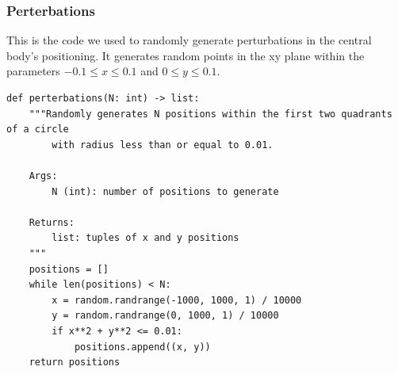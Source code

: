 \documentclass{article}
\begin{document}
\subsubsection{Perterbations}
This is the code we used to randomly generate perturbations in the central body's positioning. It generates random points in the xy plane within the parameters $-0.1 \leq x \leq 0.1$ and $0 \leq y \leq 0.1$.
\begin{verbatim}
def perterbations(N: int) -> list:
    """Randomly generates N positions within the first two quadrants of a circle 
        with radius less than or equal to 0.01.

    Args:
        N (int): number of positions to generate

    Returns:
        list: tuples of x and y positions
    """
    positions = []
    while len(positions) < N:
        x = random.randrange(-1000, 1000, 1) / 10000
        y = random.randrange(0, 1000, 1) / 10000
        if x**2 + y**2 <= 0.01:
            positions.append((x, y))
    return positions
\end{verbatim}
\end{document}
